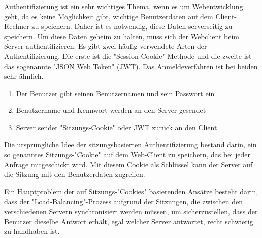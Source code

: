 Authentifizierung ist ein sehr wichtiges Thema, wenn es um Webentwicklung geht, da es keine Möglichkeit gibt, wichtige Benutzerdaten auf dem Client-Rechner zu speichern. Daher ist es notwendig, diese Daten serverseitig zu speichern. Um diese Daten geheim zu halten, muss sich der Webclient beim Server authentifizieren. Es gibt zwei häufig verwendete Arten der Authentifizierung. Die erste ist die "Session-Cookie"-Methode und die zweite ist das sogenannte "JSON Web Token" (JWT). Das Anmeldeverfahren ist bei beiden sehr ähnlich. 

\begin{enumerate}
    \item Der Benutzer gibt seinen Benutzernamen und sein Passwort ein
    \item Benutzername und Kennwort werden an den Server gesendet
    \item Server sendet "Sitzungs-Cookie" oder JWT zurück an den Client
\end{enumerate}


Die ursprüngliche Idee der sitzungsbasierten Authentifizierung bestand darin, ein so genanntes Sitzungs-"Cookie" auf dem Web-Client zu speichern, das bei jeder Anfrage mitgeschickt wird. Mit diesem Cookie als Schlüssel kann der Server auf die Sitzung mit den Benutzerdaten zugreifen. 

Ein Hauptproblem der auf Sitzungs-"Cookies" basierenden Ansätze besteht darin, dass der "Load-Balancing"-Prozess aufgrund der Sitzungen, die zwischen den verschiedenen Servern synchronisiert werden müssen, um sicherzustellen, dass der Benutzer dieselbe Antwort erhält, egal welcher Server antwortet, recht schwierig zu handhaben ist.



